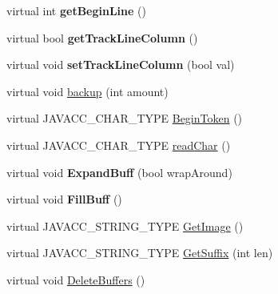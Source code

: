 \begin{DoxyCompactItemize}
\mbox{\label{classvhdl_1_1parser_1_1_char_stream_a3f296517fa30b9728af5ec8a9417800d}} 
virtual int {\bfseries get\+Begin\+Line} ()
\item 
\mbox{\label{classvhdl_1_1parser_1_1_char_stream_aa34c97a27cde33d957e4f6eaabb025b1}} 
virtual bool {\bfseries get\+Track\+Line\+Column} ()
\item 
\mbox{\label{classvhdl_1_1parser_1_1_char_stream_a12712c9866fb3495782fc0f28994d4d9}} 
virtual void {\bfseries set\+Track\+Line\+Column} (bool val)
\item 
virtual void \mbox{\hyperlink{classvhdl_1_1parser_1_1_char_stream_aea30b248a3b05857e3e60101afd2617a}{backup}} (int amount)
\item 
virtual J\+A\+V\+A\+C\+C\+\_\+\+C\+H\+A\+R\+\_\+\+T\+Y\+PE \mbox{\hyperlink{classvhdl_1_1parser_1_1_char_stream_abfef003263c49f685bfd49610dc12a08}{Begin\+Token}} ()
\item 
virtual J\+A\+V\+A\+C\+C\+\_\+\+C\+H\+A\+R\+\_\+\+T\+Y\+PE \mbox{\hyperlink{classvhdl_1_1parser_1_1_char_stream_a555f81eb2fcb4bafbe692bc3a357d120}{read\+Char}} ()
\item 
\mbox{\label{classvhdl_1_1parser_1_1_char_stream_a5192ebe3a55d14f239233283ef78559d}} 
virtual void {\bfseries Expand\+Buff} (bool wrap\+Around)
\item 
\mbox{\label{classvhdl_1_1parser_1_1_char_stream_a4d019c2c4c72dc14b442de6ce40e9607}} 
virtual void {\bfseries Fill\+Buff} ()
\item 
virtual J\+A\+V\+A\+C\+C\+\_\+\+S\+T\+R\+I\+N\+G\+\_\+\+T\+Y\+PE \mbox{\hyperlink{classvhdl_1_1parser_1_1_char_stream_a83b0313890fbf2fa4f8443039472db87}{Get\+Image}} ()
\item 
virtual J\+A\+V\+A\+C\+C\+\_\+\+S\+T\+R\+I\+N\+G\+\_\+\+T\+Y\+PE \mbox{\hyperlink{classvhdl_1_1parser_1_1_char_stream_a6a3f7e4e14d712f26aa3728c8e0e4dbf}{Get\+Suffix}} (int len)
\item 
virtual void \mbox{\hyperlink{classvhdl_1_1parser_1_1_char_stream_ade1113e8f90c93ce43cb949205f4746f}{Delete\+Buffers}} ()
\item 
\mbox{\label{classvhdl_1_1parser_1_1_char_stream_a6a84b589f280fbac29dbb2325196bb05}} 

\end{DoxyCompactItemize}
